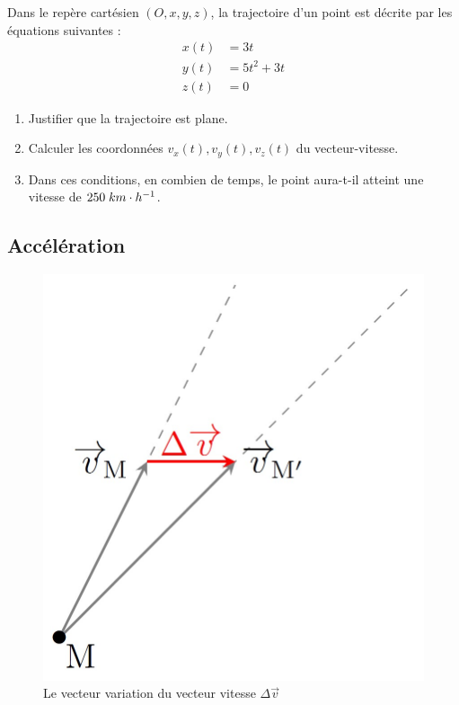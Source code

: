 \documentclass[11pt,a4paper]{article}
\begin{document}
\begin{exo}
Dans le repère cartésien $(O,x,y,z)$, la trajectoire d’un point est décrite par les équations suivantes : 
\begin{align*}
    x(t) &= 3t \\
    y(t) &= 5t^2 + 3t \\
    z(t) &= 0
\end{align*}
\begin{enumerate}
    \item Justifier que la trajectoire est plane.
    \item Calculer les coordonnées $v_x(t),v_y(t),v_z(t)$ du vecteur-vitesse.
    \item Dans ces conditions, en combien de temps, le point aura-t-il atteint une vitesse de $250\; km\cdot h^{-1} $.
\end{enumerate}
\vspace{4cm}
\end{exo}

\subsection{Accélération}

\begingroup
\begin{figure}
    \centering
    \includegraphics[width = 0.9\linewidth]{imgs/p1/acceleration.jpg}
    \caption{Le vecteur variation du vecteur vitesse $\Delta\vec{v}$}
\end{figure}
\end{document}
